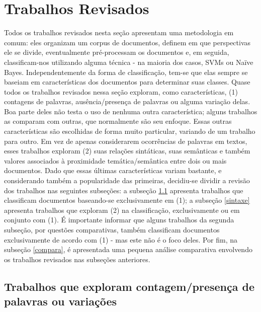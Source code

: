\section{Trabalhos Revisados}
\label{freqs:revisao}

Todos os trabalhos revisados nesta seção apresentam uma metodologia em comum: eles organizam um corpus de documentos, definem em que perspectivas ele se divide, eventualmente pré-processam os documentos e, em seguida, classificam-nos utilizando alguma técnica - na maioria dos casos, SVMs ou Naïve Bayes. Independentemente da forma de classificação, tem-se que elas sempre se baseiam em características dos documentos para determinar suas classes. 
Quase todos os trabalhos revisados nessa seção exploram, como características, (1) contagens de palavras, ausência/presença de palavras ou alguma variação delas. Boa parte deles não testa o uso de nenhuma outra característica; alguns trabalhos as comparam com outras, que normalmente são seu enfoque. Essas outras características são escolhidas de forma muito particular, variando de um trabalho para outro. Em vez de apenas considerarem ocorrências de palavras em textos, esses trabalhos exploram (2) suas relações sintáticas, suas semânticas e também valores associados à proximidade temática/semântica entre dois ou mais documentos. Dado que essas últimas características variam bastante, e considerando também a popularidade das primeiras, decidiu-se dividir a revisão dos trabalhos nas seguintes subseções: a subseção \ref{contagem} apresenta trabalhos que classificam documentos baseando-se exclusivamente em (1); a subseção \ref{sintaxe} apresenta trabalhos que exploram (2) na classificação, exclusivamente ou em conjunto com (1). É importante informar que alguns trabalhos da segunda subseção, por questões comparativas, também classificam documentos exclusivamente de acordo com (1) - mas este não é o foco deles.  Por fim, na subseção \ref{compara}, é apresentada uma pequena análise comparativa envolvendo os trabalhos revisados nas subseções anteriores.

\subsection{Trabalhos que exploram contagem/presença de palavras ou variações}
\label{contagem}

